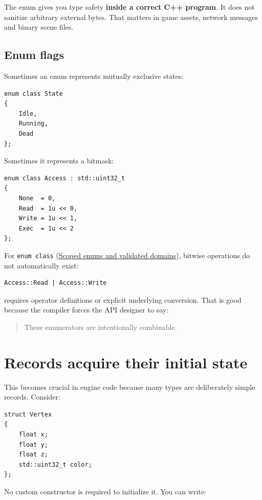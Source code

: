 The enum gives you type safety \textbf{inside a correct C++ program}. It does not sanitize arbitrary external bytes. That matters in game assets, network messages and binary scene files.

\subsection{Enum flags}\label{05-engine-i-ch003-enum-flags}

Sometimes an enum represents mutually exclusive states:

\begin{verbatim}
enum class State
{
    Idle,
    Running,
    Dead
};
\end{verbatim}

Sometimes it represents a bitmask:

\begin{verbatim}
enum class Access : std::uint32_t
{
    None  = 0,
    Read  = 1u << 0,
    Write = 1u << 1,
    Exec  = 1u << 2
};
\end{verbatim}

For \texttt{enum\ class} (\hyperref[appendix-23640fcee147]{Scoped enums and validated domains}), bitwise operations do not automatically exist:

\begin{verbatim}
Access::Read | Access::Write
\end{verbatim}

requires operator definitions or explicit underlying conversion. That is good because the compiler forces the API designer to say:

\begin{quote}
These enumerators are intentionally combinable.
\end{quote}

\section{Records acquire their initial state}\label{05-engine-i-ch003-records-acquire-their-initial-state}

This becomes crucial in engine code because many types are deliberately simple records. Consider:

\begin{verbatim}
struct Vertex
{
    float x;
    float y;
    float z;
    std::uint32_t color;
};
\end{verbatim}

No custom constructor is required to initialize it. You can write:

